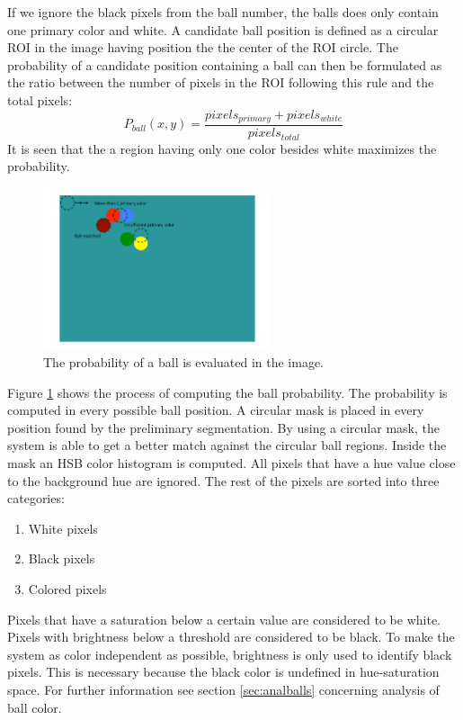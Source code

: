 If we ignore the black pixels from the ball number, the balls does only contain one primary color and white. A candidate ball position is defined as a circular ROI in the image having position the the center of the ROI circle.
The probability of a candidate position containing a ball can then be formulated as the ratio between the number of pixels in the ROI following this rule and the total pixels:
\begin{equation}
P_{ball}(x,y) = \frac{pixels_{primary} + pixels_{white}}{pixels_{total}}
\end{equation}
It is seen that the a region having only one color besides white maximizes the probability.
\begin{figure}[H]
\begin{center}
\includegraphics[width=0.6\textwidth]{images/ballfind.pdf}
\caption{The probability of a ball is evaluated in the image.}
\label{fig:ballfind}
\end{center}
\end{figure}
Figure \ref{fig:ballfind} shows the process of computing the ball probability. The probability is computed in every possible ball position.
A circular mask is placed in every position found by the preliminary segmentation. By using a circular mask, the system is able to get a better match against the circular ball regions. Inside the mask an HSB color histogram is computed. All pixels that have a hue value close to the background hue are ignored. The rest of the pixels are sorted into three categories: 
\begin{enumerate}
  \item White pixels
  \item Black pixels
  \item Colored pixels
\end{enumerate}
Pixels that have a saturation below a certain value are considered to be white. Pixels with brightness below a threshold are considered to be black. To make the system as color independent as possible, brightness is only used to identify black pixels. This is necessary because the black color is undefined in hue-saturation space. For further information see section \ref{sec:analballs} concerning analysis of ball color.

